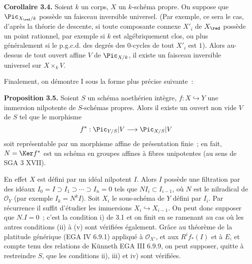 \textbf{Corollaire 3.4.} Soient \(k\) un corps, \(X\) un \(k\)-schéma propre. On suppose que \(\Pic_{X_{\red}/k}\) possède un faisceau inversible universel. (Par exemple, ce sera le cas, d'après la théorie de descente, si toute composante connexe \(X'_i\) de \(X_{\red}\) possède un point rationnel, par exemple si \(k\) est algébriquement clos, ou plus généralement si le p.g.c.d. des degrés des \(0\)-cycles de tout \(X'_i\) est \(1\)). Alors au-dessus de tout ouvert affine \(V\) de \(\Pic_{X/k}\), il existe un faisceau inversible universel sur \(X\times_kV\).

Finalement, on démontre I sous la forme plus précise suivante~:

\textbf{Proposition 3.5.} Soient \(S\) un schéma noethérien intègre, \(f:X\hookrightarrow Y\) une immersion nilpotente de \(S\)-schémas propres. Alors il existe un ouvert non vide \(V\) de \(S\) tel que le morphisme
\[
  f^*:\Pic_{Y/S}|V\longrightarrow\Pic_{X/S}|V
\]
soit représentable par un morphisme affine de présentation finie~; en fait, \(N=\Ker f^*\) est un schéma en groupes affines à fibres unipotentes (au sens de SGA 3 XVII).

En effet \(X\) est défini par un idéal nilpotent \(I\). Alors \(I\) possède une filtration par des idéaux \(I_0=I\supset I_1\supset\cdots\supset I_n=0\) tels que \(NI_i\subset I_{i-1}\), où \(N\) est le nilradical de \(\mathcal O_Y\) (par exemple \(I_k=N^kI\)). Soit \(X_i\) le sous-schéma de \(Y\) défini par \(I_i\). Par récurrence il suffit d'étudier les immersions \(X_i\hookrightarrow X_{i-1}\). On peut donc supposer que \(N.I=0\)~; c'est la condition i) de 3.1 et on finit en se ramenant au cas où les autres conditions (ii) à (v) sont vérifiées également. Grâce au théorème de la platitude générique (EGA IV 6.9.1) appliqué à \(\mathcal O_{X'}\), et aux \(R^if_*(I)\) et à \(E\), et compte tenu des relations de Künneth EGA III 6.9.9, on peut supposer, quitte à restreindre \(S\), que les conditions ii), iii) et iv) sont vérifiées.

